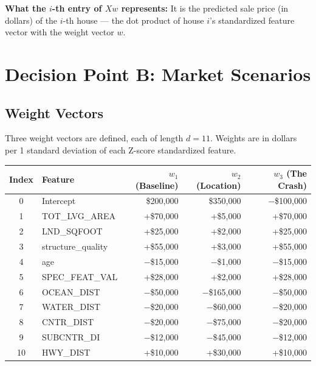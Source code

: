 \documentclass[11pt]{article}
\begin{document}
\textbf{What the $i$-th entry of $Xw$ represents:} It is the predicted sale price (in dollars) of the $i$-th house --- the dot product of house $i$'s standardized feature vector with the weight vector $w$.

\section{Decision Point B: Market Scenarios}

\subsection*{Weight Vectors}

Three weight vectors are defined, each of length $d = 11$. Weights are in dollars per 1 standard deviation of each Z-score standardized feature.

\begin{center}
\scriptsize
\begin{longtable}{c l r r r}
\toprule
Index & Feature & $w_1$ (Baseline) & $w_2$ (Location) & $w_3$ (The Crash) \\
\midrule
0  & Intercept        & \$200,000  & \$350,000  & $-$\$100,000 \\
1  & TOT\_LVG\_AREA   & +\$70,000  & +\$5,000   & +\$70,000  \\
2  & LND\_SQFOOT      & +\$25,000  & +\$2,000   & +\$25,000  \\
3  & structure\_quality & +\$55,000 & +\$3,000   & +\$55,000  \\
4  & age              & $-$\$15,000 & $-$\$1,000 & $-$\$15,000 \\
5  & SPEC\_FEAT\_VAL  & +\$28,000  & +\$2,000   & +\$28,000  \\
6  & OCEAN\_DIST      & $-$\$50,000 & $-$\$165,000 & $-$\$50,000 \\
7  & WATER\_DIST      & $-$\$20,000 & $-$\$60,000 & $-$\$20,000 \\
8  & CNTR\_DIST       & $-$\$20,000 & $-$\$75,000 & $-$\$20,000 \\
9  & SUBCNTR\_DI      & $-$\$12,000 & $-$\$45,000 & $-$\$12,000 \\
10 & HWY\_DIST        & +\$10,000  & +\$30,000  & +\$10,000  \\
\bottomrule
\end{longtable}
\end{center}
\end{document}
